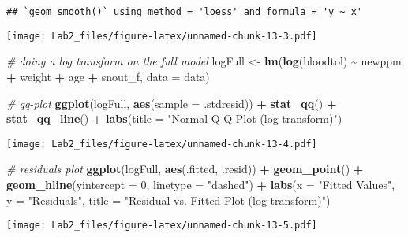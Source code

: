 \documentclass[
]{article}
\newenvironment{Shaded}{\begin{snugshade}}{\end{snugshade}}
\newcommand{\AttributeTok}[1]{\textcolor[rgb]{0.13,0.29,0.53}{#1}}
\newcommand{\CommentTok}[1]{\textcolor[rgb]{0.56,0.35,0.01}{\textit{#1}}}
\newcommand{\DecValTok}[1]{\textcolor[rgb]{0.00,0.00,0.81}{#1}}
\newcommand{\FunctionTok}[1]{\textcolor[rgb]{0.13,0.29,0.53}{\textbf{#1}}}
\newcommand{\NormalTok}[1]{#1}
\newcommand{\OtherTok}[1]{\textcolor[rgb]{0.56,0.35,0.01}{#1}}
\newcommand{\SpecialCharTok}[1]{\textcolor[rgb]{0.81,0.36,0.00}{\textbf{#1}}}
\newcommand{\StringTok}[1]{\textcolor[rgb]{0.31,0.60,0.02}{#1}}
\begin{document}
\begin{verbatim}
## `geom_smooth()` using method = 'loess' and formula = 'y ~ x'
\end{verbatim}

\texttt{[image: Lab2\_files/figure-latex/unnamed-chunk-13-3.pdf]}

\begin{Shaded}
\begin{Highlighting}[]
\CommentTok{\# doing a log transform on the full model}
\NormalTok{logFull }\OtherTok{\textless{}{-}} \FunctionTok{lm}\NormalTok{(}\FunctionTok{log}\NormalTok{(bloodtol) }\SpecialCharTok{\textasciitilde{}}\NormalTok{ newppm }\SpecialCharTok{+}\NormalTok{ weight }\SpecialCharTok{+}\NormalTok{ age }\SpecialCharTok{+}\NormalTok{ snout\_f, }\AttributeTok{data =}\NormalTok{ data)}

\CommentTok{\# qq{-}plot}
\FunctionTok{ggplot}\NormalTok{(logFull, }\FunctionTok{aes}\NormalTok{(}\AttributeTok{sample =}\NormalTok{ .stdresid)) }\SpecialCharTok{+}
  \FunctionTok{stat\_qq}\NormalTok{() }\SpecialCharTok{+}
  \FunctionTok{stat\_qq\_line}\NormalTok{() }\SpecialCharTok{+}
  \FunctionTok{labs}\NormalTok{(}\AttributeTok{title =} \StringTok{"Normal Q{-}Q Plot (log transform)"}\NormalTok{)}
\end{Highlighting}
\end{Shaded}

\texttt{[image: Lab2\_files/figure-latex/unnamed-chunk-13-4.pdf]}

\begin{Shaded}
\begin{Highlighting}[]
\CommentTok{\# residuals plot}
\FunctionTok{ggplot}\NormalTok{(logFull, }\FunctionTok{aes}\NormalTok{(.fitted, .resid)) }\SpecialCharTok{+}
  \FunctionTok{geom\_point}\NormalTok{() }\SpecialCharTok{+}
  \FunctionTok{geom\_hline}\NormalTok{(}\AttributeTok{yintercept =} \DecValTok{0}\NormalTok{, }\AttributeTok{linetype =} \StringTok{"dashed"}\NormalTok{) }\SpecialCharTok{+}
  \FunctionTok{labs}\NormalTok{(}\AttributeTok{x =} \StringTok{"Fitted Values"}\NormalTok{, }\AttributeTok{y =} \StringTok{"Residuals"}\NormalTok{, }\AttributeTok{title =} \StringTok{"Residual vs. Fitted Plot (log transform)"}\NormalTok{)}
\end{Highlighting}
\end{Shaded}

\texttt{[image: Lab2\_files/figure-latex/unnamed-chunk-13-5.pdf]}
\end{document}
